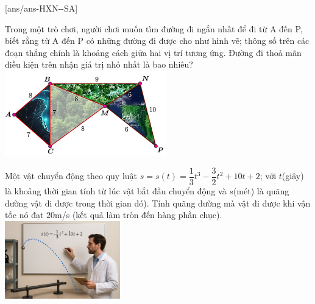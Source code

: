 \caukq
{}[ans/ans-HXN-\sode-SA]

\begin{ex}%
    \immini
    {
        Trong một trò chơi, người chơi muốn tìm đường đi ngắn nhất để đi từ A đến P, biết rằng từ A đến P có những đường đi được cho như hình vẽ; thông số trên các đoạn thẳng chính là khoảng cách giữa hai vị trí tương ứng. Đường đi thoả mãn điều kiện trên nhận giá trị nhỏ nhất là bao nhiêu?
    }
    {
        \includegraphics[width=7cm]{img/HXN-9-17}
    }
    \end{ex}
    
    \begin{ex}%
\immini
{
    Một vật chuyển động theo quy luật $ s=s(t)=\dfrac{1}{3}{t^3}-\dfrac{3}{2}{t^2}+10t+2$; với $ t$(giây) là khoảng thời gian tính từ lúc vật bắt đầu chuyển động và $ s$(mét) là quãng đường vật đi được trong thời gian đó). Tính quãng đường mà vật đi được khi vận tốc nó đạt $ 20$m/s (kết quả làm tròn đến hàng phần chục).
}
{
    \includegraphics[width=5cm]{img/HXN-9-18}
}
\end{ex}

